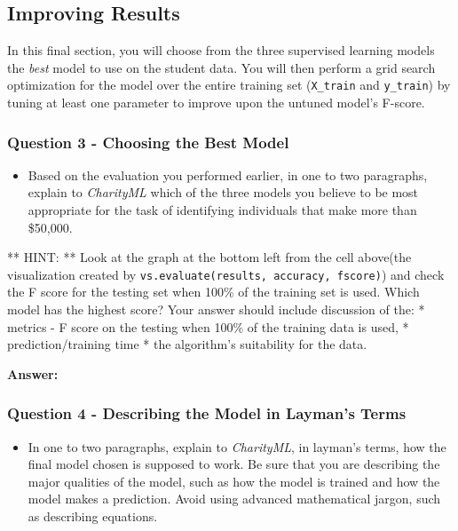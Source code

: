 \documentclass[11pt]{article}
\providecommand{\tightlist}{%
      \setlength{\itemsep}{0pt}\setlength{\parskip}{0pt}}
\begin{document}
\subsection{Improving Results}\label{improving-results}

In this final section, you will choose from the three supervised
learning models the \emph{best} model to use on the student data. You
will then perform a grid search optimization for the model over the
entire training set (\texttt{X\_train} and \texttt{y\_train}) by tuning
at least one parameter to improve upon the untuned model's F-score.

    \subsubsection{Question 3 - Choosing the Best
Model}\label{question-3---choosing-the-best-model}

\begin{itemize}
\tightlist
\item
  Based on the evaluation you performed earlier, in one to two
  paragraphs, explain to \emph{CharityML} which of the three models you
  believe to be most appropriate for the task of identifying individuals
  that make more than \$50,000.
\end{itemize}

** HINT: ** Look at the graph at the bottom left from the cell above(the
visualization created by
\texttt{vs.evaluate(results,\ accuracy,\ fscore)}) and check the F score
for the testing set when 100\% of the training set is used. Which model
has the highest score? Your answer should include discussion of the: *
metrics - F score on the testing when 100\% of the training data is
used, * prediction/training time * the algorithm's suitability for the
data.

    \textbf{Answer: }

    \subsubsection{Question 4 - Describing the Model in Layman's
Terms}\label{question-4---describing-the-model-in-laymans-terms}

\begin{itemize}
\tightlist
\item
  In one to two paragraphs, explain to \emph{CharityML}, in layman's
  terms, how the final model chosen is supposed to work. Be sure that
  you are describing the major qualities of the model, such as how the
  model is trained and how the model makes a prediction. Avoid using
  advanced mathematical jargon, such as describing equations.
\end{itemize}
\end{document}
